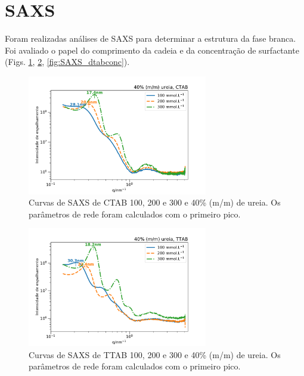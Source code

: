 \section{SAXS}

	Foram realizadas análises de SAXS para determinar a estrutura da fase branca. Foi avaliado o papel do comprimento da cadeia e da concentração de surfactante (Figs. \ref{fig:SAXS_ctabconc}, \ref{fig:SAXS_ttabconc}, \ref{fig:SAXS_dtabconc}).
	
	\begin{figure}[H]
		\centering
		\includegraphics[width=0.7\textwidth]{imagens/saxs/CTAB_conc}
		\caption{Curvas de SAXS de CTAB 100, 200 e 300 \mM{} e 40\% (m/m) de ureia. Os parâmetros de rede foram calculados com o primeiro pico.}
		\label{fig:SAXS_ctabconc}
	\end{figure}
	
	\begin{figure}[H]
		\centering
		\includegraphics[width=0.7\textwidth]{imagens/saxs/TTAB_conc}
		\caption{Curvas de SAXS de TTAB 100, 200 e 300 \mM{} e 40\% (m/m) de ureia. Os parâmetros de rede foram calculados com o primeiro pico.}
		\label{fig:SAXS_ttabconc}
	\end{figure}
	
